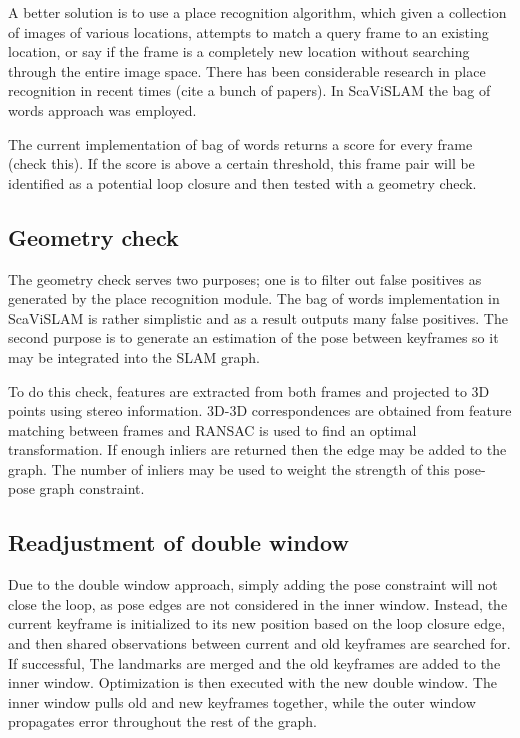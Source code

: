 A better solution is to use a place recognition algorithm, which given a collection of images of
various locations, attempts to match a query frame to an existing location, or say if the frame is
a completely new location without searching through the entire image space.  There has been
considerable research in place recognition in recent times (cite a bunch of papers).  In ScaViSLAM
the bag of words approach was employed.


The current implementation of bag of words returns a score for every frame (check this).  If the
score is above a certain threshold, this frame pair will be identified as a potential loop closure
and then tested with a geometry check.

\subsection{Geometry check}

The geometry check serves two purposes; one is to filter out false positives as generated by the
place recognition module.  The bag of words implementation in ScaViSLAM is rather simplistic and as
a result outputs many false positives.  The second purpose is to generate an estimation of the
pose between keyframes so it may be integrated into the SLAM graph.  

To do this check, features are extracted from both frames and projected to 3D points using stereo
information.  3D-3D correspondences are obtained from feature matching between frames and RANSAC is
used to find an optimal transformation.  If enough inliers are returned then the edge may be added
to the graph.  The number of inliers may be used to weight the strength of this pose-pose graph
constraint.

\subsection{Readjustment of double window}
Due to the double window approach, simply adding the pose constraint will not close the loop, as
pose edges are not considered in the inner window.  Instead, the current keyframe is initialized to
its new position based on the loop closure edge, and then shared observations between current and
old keyframes are searched for.  If successful, The landmarks are merged and the old keyframes are
added to the inner window.  Optimization is then executed with the new double window.  The inner
window pulls old and new keyframes together, while the outer window propagates error throughout the
rest of the graph.

